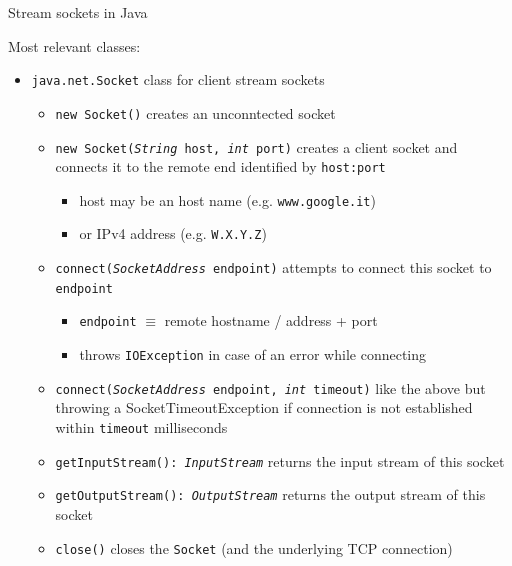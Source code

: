 \documentclass{beamer}\mode<presentation>{\usetheme{AMSBolognaFC}}
\begin{document}
\begin{frame}[c, allowframebreaks]{Stream sockets in Java}

    Most relevant classes:
    \bigskip
    \begin{itemize}
        \item \texttt{java.net.\alert{Socket}} class for \alert{client} stream sockets 
        \begin{itemize}
            \item \alert{\texttt{new Socket()}} creates an unconntected socket
            \item \alert{\texttt{new Socket(\textit{String} host, \textit{int} port)}} creates a client socket and connects it to the remote end identified by \texttt{host:port}
            \begin{itemize}
                \item host may be an host name (e.g. \texttt{www.google.it})
                \item or IPv4 address (e.g. \texttt{W.X.Y.Z})
            \end{itemize}
            \item \alert{\texttt{connect(\textit{SocketAddress} endpoint)}} attempts to connect this socket to \texttt{endpoint}
            \begin{itemize}
                \item \texttt{endpoint} $\equiv$ remote hostname / address + port
                \item throws \texttt{IOException} in case of an error while connecting
            \end{itemize}

            \item \alert{\texttt{connect(\textit{SocketAddress} endpoint, \textit{int} timeout)}} like the above but throwing a \alert{SocketTimeoutException} if connection is not established within \texttt{timeout} milliseconds

            \item \alert{\texttt{getInputStream(): \textit{InputStream}}} returns the input stream of this socket

            \item \alert{\texttt{getOutputStream(): \textit{OutputStream}}} returns the output stream of this socket

            \item \alert{\texttt{close()}} closes the \texttt{Socket} (and the underlying TCP connection)
        \end{itemize}


\end{itemize}
\end{frame}
\end{document}
